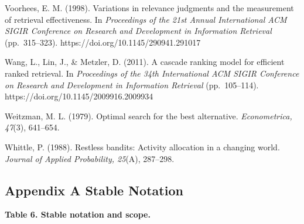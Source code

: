 \documentclass[
  11pt]{article}
\begin{document}
Voorhees, E. M. (1998). Variations in relevance judgments and the
measurement of retrieval effectiveness. In \emph{Proceedings of the 21st
Annual International ACM SIGIR Conference on Research and Development in
Information Retrieval} (pp.~315--323).
https://doi.org/10.1145/290941.291017

Wang, L., Lin, J., \& Metzler, D. (2011). A cascade ranking model for
efficient ranked retrieval. In \emph{Proceedings of the 34th
International ACM SIGIR Conference on Research and Development in
Information Retrieval} (pp.~105--114).
https://doi.org/10.1145/2009916.2009934

Weitzman, M. L. (1979). Optimal search for the best alternative.
\emph{Econometrica, 47}(3), 641--654.

Whittle, P. (1988). Restless bandits: Activity allocation in a changing
world. \emph{Journal of Applied Probability, 25}(A), 287--298.

\subsection{Appendix A Stable
Notation}\label{appendix-a-stable-notation}

\textbf{Table 6. Stable notation and scope.}
\end{document}
